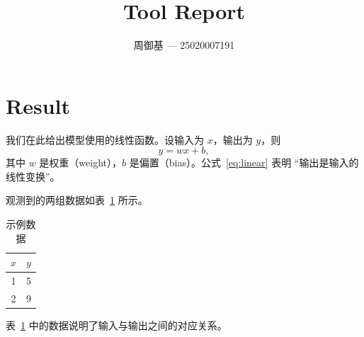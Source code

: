 \documentclass{article}
\begin{document}
\title{Tool Report}
\author{周御基 --- 25020007191}
\maketitle
\section{Result}

我们在此给出模型使用的线性函数。设输入为 $x$，输出为 $y$，则
\begin{equation}
  y = w x + b,
  \label{eq:linear}
\end{equation}
其中 $w$ 是权重（weight），$b$ 是偏置（bias）。公式~\eqref{eq:linear} 表明
``输出是输入的线性变换''。

观测到的两组数据如表~\ref{tab:data} 所示。

\begin{table}[htbp]
  \centering
  \begin{tabular}{cc}
    \toprule
    $x$ & $y$ \\
    \midrule
    1 & 5 \\
    2 & 9 \\
    \bottomrule
  \end{tabular}
  \caption{示例数据}
  \label{tab:data}
\end{table}

表~\ref{tab:data} 中的数据说明了输入与输出之间的对应关系。
\end{document}
